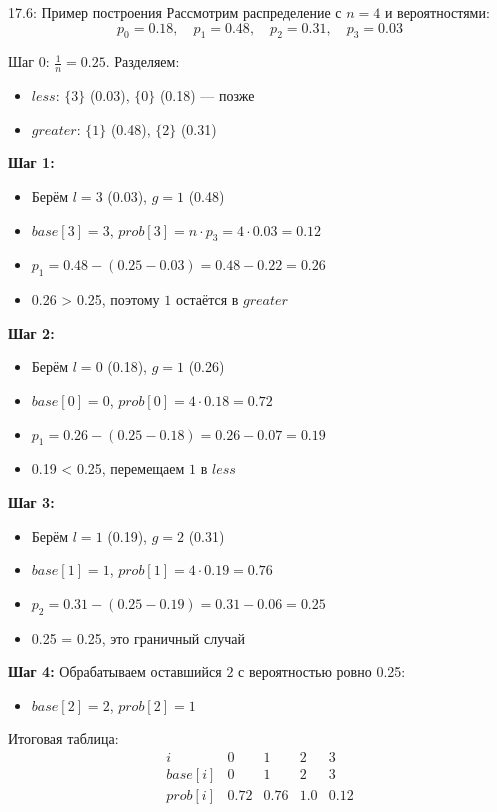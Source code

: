 \documentclass[a4paper,12pt]{article}
\begin{document}
	\begin{examplebox}{17.6: Пример построения}
		Рассмотрим распределение с \(n=4\) и вероятностями:
		\[ p_0 = 0.18, \quad p_1 = 0.48, \quad p_2 = 0.31, \quad p_3 = 0.03 \]
		
		Шаг 0: \(\frac{1}{n} = 0.25\). Разделяем:
		\begin{itemize}
			\item \(less\): \(\{3\}\) (0.03), \(\{0\}\) (0.18) — позже
			\item \(greater\): \(\{1\}\) (0.48), \(\{2\}\) (0.31)
		\end{itemize}
		
		\textbf{Шаг 1:}
		\begin{itemize}
			\item Берём \(l = 3\) (0.03), \(g = 1\) (0.48)
			\item \(base[3] = 3\), \(prob[3] = n \cdot p_3 = 4 \cdot 0.03 = 0.12\)
			\item \(p_1 = 0.48 - (0.25 - 0.03) = 0.48 - 0.22 = 0.26\)
			\item 0.26 > 0.25, поэтому \(1\) остаётся в \(greater\)
		\end{itemize}
		
		\textbf{Шаг 2:}
		\begin{itemize}
			\item Берём \(l = 0\) (0.18), \(g = 1\) (0.26)
			\item \(base[0] = 0\), \(prob[0] = 4 \cdot 0.18 = 0.72\)
			\item \(p_1 = 0.26 - (0.25 - 0.18) = 0.26 - 0.07 = 0.19\)
			\item 0.19 < 0.25, перемещаем \(1\) в \(less\)
		\end{itemize}
		
		\textbf{Шаг 3:}
		\begin{itemize}
			\item Берём \(l = 1\) (0.19), \(g = 2\) (0.31)
			\item \(base[1] = 1\), \(prob[1] = 4 \cdot 0.19 = 0.76\)
			\item \(p_2 = 0.31 - (0.25 - 0.19) = 0.31 - 0.06 = 0.25\)
			\item 0.25 = 0.25, это граничный случай
		\end{itemize}
		
		\textbf{Шаг 4:} Обрабатываем оставшийся \(2\) с вероятностью ровно 0.25:
		\begin{itemize}
			\item \(base[2] = 2\), \(prob[2] = 1\)
		\end{itemize}
		
		Итоговая таблица:
		\[
		\begin{array}{c|cccc}
			i & 0 & 1 & 2 & 3 \\ \hline
			base[i] & 0 & 1 & 2 & 3 \\
			prob[i] & 0.72 & 0.76 & 1.0 & 0.12
		\end{array}
		\]
	\end{examplebox}
	
\end{document}
